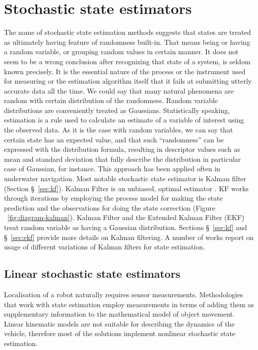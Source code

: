 \section{Stochastic state estimators}
The name of stochastic state estimation methods suggests that states are treated as ultimately having feature of randomness built-in. That means being or having a random variable, or grouping random values in certain manner. It does not seem to be a wrong conclusion after recognizing that state of a system, is seldom known precisely. It is the essential nature of the process or the instrument used for measuring or the estimation algorithm itself that it fails at submitting utterly accurate data all the time. We could say that many natural phenomena are random with certain distribution of the randomness. Random variable distributions are conveniently treated as Gaussians. Statistically speaking, estimation is a rule used to calculate an estimate of a variable of interest using the observed data. As it is the case with random variables, we can say that certain state has an expected value, and that such ``randomness'' can be expressed with the distribution formula, resulting in descriptor values such as mean and standard deviation that fully describe the distribution in particular case of Gaussian, for instance. This approach has been applied often in underwater navigation. Most notable stochastic state estimator is Kalman filter (Section \S~\ref{sec:kf}). Kalman Filter is an unbiased, optimal estimator \cite{kalman60, grewal01}. KF works through iterations by employing the process model for making the state prediction and the observations for doing the state correction (Figure ~\ref{fig:diagram-kalman}). Kalman Filter and the Extended Kalman Filter (EKF) treat random variable as having a Gaussian distribution. Sections \S~\ref{sec:kf} and \S~\ref{sec:ekf} provide more details on Kalman filtering. A number of works report on usage of different variations of Kalman filters for state estimation. %
\subsection{Linear stochastic state estimators}
Localisation of a robot naturally requires sensor measurements. Methodologies that work with state estimation employ measurements in terms of adding them as supplementary information to the mathematical model of object movement. Linear kinematic models are not suitable for describing the dynamics of the vehicle, therefore most of the solutions implement nonlinear stochastic state estimation.   
